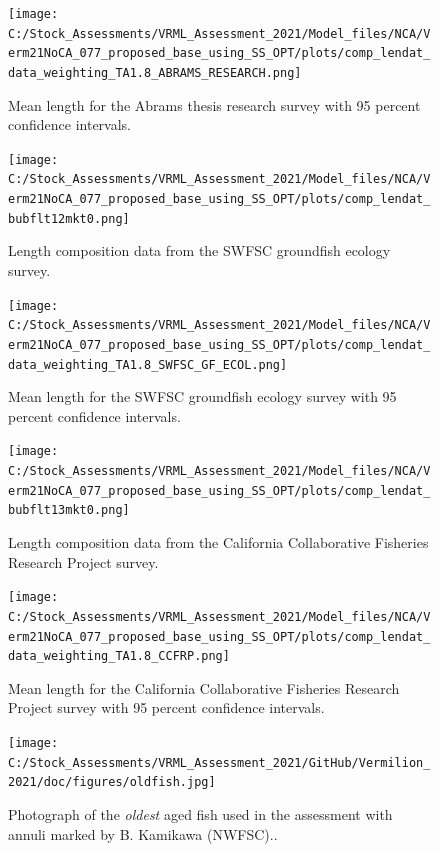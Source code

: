 \documentclass[11pt,
  english,
  a4paper,
]{article}
\begin{document}
\begin{figure}
\centering
\texttt{[image: C:/Stock\_Assessments/VRML\_Assessment\_2021/Model\_files/NCA/Verm21NoCA\_077\_proposed\_base\_using\_SS\_OPT/plots/comp\_lendat\_data\_weighting\_TA1.8\_ABRAMS\_RESEARCH.png]}
\caption{Mean length for the Abrams thesis research survey with 95 percent confidence intervals.\label{fig:mean-com-len-data-ABRAMS-RESEARCH}}
\end{figure}

\begin{figure}
\centering
\texttt{[image: C:/Stock\_Assessments/VRML\_Assessment\_2021/Model\_files/NCA/Verm21NoCA\_077\_proposed\_base\_using\_SS\_OPT/plots/comp\_lendat\_bubflt12mkt0.png]}
\caption{Length composition data from the SWFSC groundfish ecology survey.\label{fig:len-data-SWFSC-GF-ECOL}}
\end{figure}

\begin{figure}
\centering
\texttt{[image: C:/Stock\_Assessments/VRML\_Assessment\_2021/Model\_files/NCA/Verm21NoCA\_077\_proposed\_base\_using\_SS\_OPT/plots/comp\_lendat\_data\_weighting\_TA1.8\_SWFSC\_GF\_ECOL.png]}
\caption{Mean length for the SWFSC groundfish ecology survey with 95 percent confidence intervals.\label{fig:mean-com-len-data-SWFSC-GF-ECOL}}
\end{figure}

\begin{figure}
\centering
\texttt{[image: C:/Stock\_Assessments/VRML\_Assessment\_2021/Model\_files/NCA/Verm21NoCA\_077\_proposed\_base\_using\_SS\_OPT/plots/comp\_lendat\_bubflt13mkt0.png]}
\caption{Length composition data from the California Collaborative Fisheries Research Project survey.\label{fig:len-data-CCFRP}}
\end{figure}

\begin{figure}
\centering
\texttt{[image: C:/Stock\_Assessments/VRML\_Assessment\_2021/Model\_files/NCA/Verm21NoCA\_077\_proposed\_base\_using\_SS\_OPT/plots/comp\_lendat\_data\_weighting\_TA1.8\_CCFRP.png]}
\caption{Mean length for the California Collaborative Fisheries Research Project survey with 95 percent confidence intervals.\label{fig:mean-com-len-data-CCFRP}}
\end{figure}

\begin{figure}
\centering
\texttt{[image: C:/Stock\_Assessments/VRML\_Assessment\_2021/GitHub/Vermilion\_2021/doc/figures/oldfish.jpg]}
\caption{Photograph of the \emph{oldest} aged fish used in the assessment with annuli marked by B. Kamikawa (NWFSC)..\label{fig:oldfish}}
\end{figure}
\end{document}
